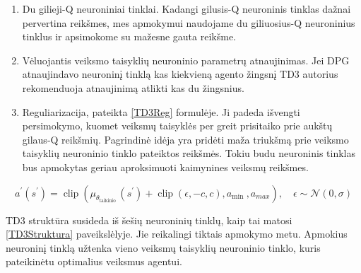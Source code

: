\documentclass[a4paper, 12pt]{article}
\begin{document}
\begin{enumerate}
  \addtolength{\itemsep}{-0.5\baselineskip} 
  \item Du gilieji-Q neuroniniai tinklai. Kadangi gilusis-Q neuroninis tinklas dažnai pervertina reikšmes, mes apmokymui naudojame du giliuosius-Q neuroninius tinklus ir apsimokome su mažesne gauta reikšme.
  \item Vėluojantis veiksmo taisyklių neuroninio parametrų atnaujinimas. Jei DPG atnaujindavo neuroninį tinklą kas kiekvieną agento žingsnį TD3 autorius rekomenduoja atnaujinimą atlikti kas du žingsnius. 
  \item Reguliarizacija, pateikta \ref{TD3Reg} formulėje. Ji padeda išvengti persimokymo, kuomet veiksmų taisyklės per greit prisitaiko prie aukštų gilaus-Q reikšmių. Pagrindinė idėja yra pridėti maža triukšmą prie veiksmo taisyklių neuroninio tinklo pateiktos reikšmės. Tokiu budu neuroninis tinklas bus apmokytas geriau aproksimuoti kaimynines veiksmų reikšmes.
\end{enumerate}

\begin{equation}
\label{TD3Reg}
a^{\prime}\left(s^{\prime}\right)=\operatorname{clip}\left(\mu_{\theta_{\text {taikinio }}}\left(s^{\prime}\right)+\operatorname{clip}(\epsilon,-c, c), a_{\text {min }}, a_{max}\right), \quad \epsilon \sim \mathcal{N}(0, \sigma)
\end{equation}

TD3 struktūra susideda iš šešių neuroninių tinklų, kaip tai matosi \ref{TD3Struktura} paveikslėlyje. Jie reikalingi tiktais apmokymo metu. Apmokius neuroninį tinklą užtenka vieno veiksmų taisyklių neuroninio tinklo, kuris pateikinėtu optimalius veiksmus agentui.
\end{document}
